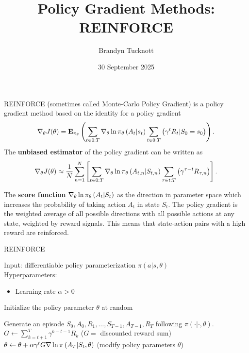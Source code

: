 \documentclass{exam}
\title{Policy Gradient Methods: REINFORCE}
\author{Brandyn Tucknott}
\date{30 September 2025}
\begin{document}
\maketitle

REINFORCE (sometimes called Monte-Carlo Policy Gradient) is a policy gradient method based on the identity for a policy gradient
$$\nabla_\theta J(\theta) = \mathbf{E}_{\pi_\theta}\left( \sum_{t\in0:T} \nabla_\theta \ln \pi_\theta\left( A_t | s_t \right)\sum_{t\in 0:T} \left( \gamma^tR_t | S_0 = s_0 \right) \right).$$
The \textbf{unbiased estimator} of the policy gradient can be written as
$$\nabla_\theta J(\theta) \approx \frac{1}{N}\sum_{n = 1}^N \left[ \sum_{t\in 0:T} \nabla_\theta \ln \pi_\theta\left( A_{t, n} | S_{t, n} \right)\sum_{\tau\in t:T} \left( \gamma^{\tau - t}R_{\tau, n} \right) \right].$$

The \textbf{score function} $\nabla_\theta \ln \pi_\theta\left( A_t | S_t \right)$ as the direction in parameter space which increases the probability
of taking action $A_t$ in state $S_t$. The policy gradient is the weighted average of all possible directions with all possible actions
at any state, weighted by reward signals. This means that state-action pairs with a high reward are reinforced.

\begin{algorithm}
    \caption{REINFORCE}
    Input: differentiable policy parameterization $\pi (a | s, \theta)$ \\
    Hyperparameters:
    \begin{itemize}
        \item Learning rate $\alpha > 0$
    \end{itemize}
    Initialize the policy parameter $\theta$ at random

    \begin{algorithmic}[1]
            \State Generate an episode $S_0, A_0, R_1, \hdots, S_{T - 1}, A_{T - 1}, R_T$ following $\pi (\cdot | \cdot, \theta)$.
                \State $G \gets \sum_{k = t + 1}^T \gamma^{k - t - 1}R_k$ ($G =$ discounted reward sum)
                \State $\theta \gets \theta + \alpha \gamma^tG\nabla \ln \pi\left( A_T | S_t, \theta \right)$ (modify policy parameters $\theta$)
    \end{algorithmic}
\end{algorithm}
\end{document}
